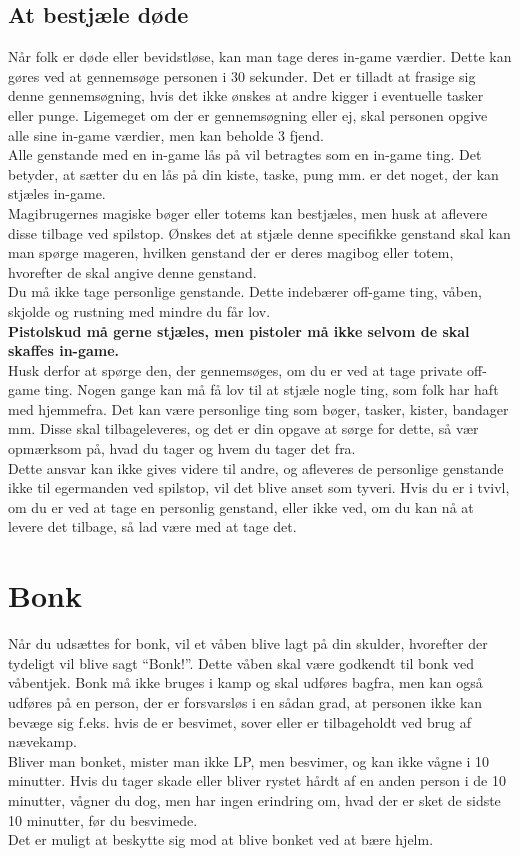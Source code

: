 \subsection*{At bestjæle døde}
Når folk er døde eller bevidstløse, kan man tage deres in-game værdier. Dette kan gøres ved at gennemsøge personen i 30 sekunder. Det er tilladt at frasige sig denne gennemsøgning, hvis det ikke ønskes at andre kigger i eventuelle tasker eller punge.
Ligemeget om der er gennemsøgning eller ej, skal personen opgive alle sine in-game værdier, men kan beholde 3 fjend.\\
Alle genstande med en in-game lås på vil betragtes som en in-game ting. Det betyder, at sætter du en lås på din kiste, taske, pung mm. er det noget, der kan stjæles in-game.\\
Magibrugernes magiske bøger eller totems kan bestjæles, men husk at aflevere disse tilbage ved spilstop. Ønskes det at stjæle denne specifikke genstand skal kan man spørge mageren, hvilken genstand der er deres magibog eller totem, hvorefter de skal angive denne genstand.\\
Du må ikke tage personlige genstande. Dette indebærer off-game ting, våben, skjolde og rustning med mindre du får lov.\\
\textbf{Pistolskud må gerne stjæles, men pistoler må ikke selvom de skal skaffes in-game.}\\
Husk derfor at spørge den, der gennemsøges, om du er ved at tage private off-game ting.
Nogen gange kan må få lov til at stjæle nogle ting, som folk har haft med hjemmefra. Det kan være personlige ting som bøger, tasker, kister, bandager mm. Disse skal tilbageleveres, og det er din opgave at sørge for dette, så vær opmærksom på, hvad du tager og hvem du tager det fra.\\
Dette ansvar kan ikke gives videre til andre, og afleveres de personlige genstande ikke til egermanden ved spilstop, vil det blive anset som tyveri. Hvis du er i tvivl, om du er ved at tage en personlig genstand, eller ikke ved, om du kan nå at levere det tilbage, så lad være med at tage det.

\section*{Bonk}
Når du udsættes for bonk, vil et våben blive lagt på din skulder, hvorefter der tydeligt vil blive sagt “Bonk!”. Dette våben skal være godkendt til bonk ved våbentjek.
Bonk må ikke bruges i kamp og skal udføres bagfra, men kan også udføres på en person, der er forsvarsløs i en sådan grad, at personen ikke kan bevæge sig f.eks. hvis de er besvimet, sover eller er tilbageholdt ved brug af nævekamp.\\
Bliver man bonket, mister man ikke LP, men besvimer, og kan ikke vågne i 10 minutter. Hvis du tager skade eller bliver rystet hårdt af en anden person i de 10 minutter, vågner du dog, men har ingen erindring om, hvad der er sket de sidste 10 minutter, før du besvimede.\\
Det er muligt at beskytte sig mod at blive bonket ved at bære hjelm.

